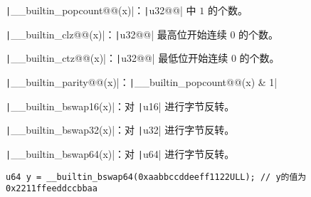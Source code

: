 
\texttt|__builtin_popcount@{\color{red}{ll}}@(x)|：\texttt|u32@{\color{red}{/u64}}@| 中 $1$ 的个数。

\texttt|__builtin_clz@{\color{red}{ll}}@(x)|：\texttt|u32@{\color{red}{/u64}}@| 最高位开始连续 $0$ 的个数。

\texttt|__builtin_ctz@{\color{red}{ll}}@(x)|：\texttt|u32@{\color{red}{/u64}}@| 最低位开始连续 $0$ 的个数。

\texttt|__builtin_parity@{\color{red}{ll}}@(x)|：\texttt|__builtin_popcount@{\color{red}{ll}}@(x) & 1|

\texttt|__builtin_bswap16(x)|：对 \texttt|u16| 进行字节反转。

\texttt|__builtin_bswap32(x)|：对 \texttt|u32| 进行字节反转。

\texttt|__builtin_bswap64(x)|：对 \texttt|u64| 进行字节反转。

\begin{verbatim}
u64 y = __builtin_bswap64(0xaabbccddeeff1122ULL); // y的值为0x2211ffeeddccbbaa
\end{verbatim}
